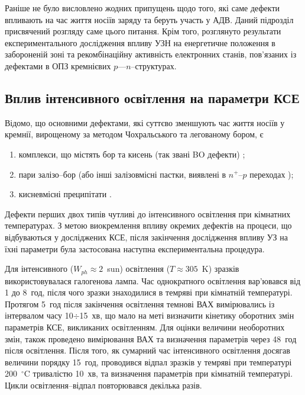 Раніше не було висловлено жодних припущень щодо того, які саме дефекти впливають на час життя
носіїв заряду та беруть участь у АДВ.
Даний підрозділ присвячений розгляду саме цього питання.
Крім того, розглянуто результати експериментального дослідження впливу УЗН на енергетичне положення в забороненій зоні та
рекомбінаційну активність електронних станів, пов'язаних із дефектами в ОПЗ кремнієвих $p$---$n$--структурах.

\subsection{Вплив інтенсивного освітлення на параметри КСЕ\label{sbDefectType}}
Відомо, що основними дефектами, які суттєво зменшують час життя носіїв у кремнії, вирощеному
за методом Чохральського та легованому бором, є
\begin{enumerate}[label=\asbuk*),leftmargin=0em,itemindent=1.5em]
\item  комплекси, що містять бор та кисень (так звані BO дефекти) \cite{LIDRev,LIDRev2};
\item пари залізо--бор \cite{MurphyJAP2011,FeB:Vahanissi,FeB:Schmidt} (або інші залізовмісні пастки, виявлені в $n^+$--$p$ переходах \cite{TeimurazPSS,TeimurazJAP});
\item кисневмісні преципітати \cite{MurphySC2014,Oxide_Schon,MurphyJAP2011,MurphyJAP2012,Oxide:Chen,Oxide:Porrini}.
\end{enumerate}
Дефекти перших двох типів чутливі до інтенсивного освітлення при кімнатних температурах.
З метою виокремлення впливу окремих дефектів на процеси, що відбуваються у досліджених КСЕ,
після закінчення дослідження впливу УЗ на їхні параметри
була застосована наступна експериментальна процедура.

Для інтенсивного ($W_{ph}\approx2$~sun) освітлення ($T\approx305$~K) зразків використовувалася галогенова лампа.
Час однократного освітлення вар'ювався від 1 до 8~год, після чого
зразки знаходилися в темряві при кімнатній температурі.
Протягом 5~год після закінчення освітлення темнові ВАХ вимірювались із інтервалом часу 10$\div$15~хв,
що мало на меті визначити кінетику оборотних змін параметрів КСЕ, викликаних освітленням.
Для оцінки величини необоротних змін, також проведено вимірювання ВАХ та визначення параметрів через 48~год
після освітлення.
Після того, як сумарний час інтенсивного освітлення досягав величини порядку 15~год,
проводився відпал зразків у темряві при температурі 200~$^\circ$C тривалістю 10~хв,
та визначення параметрів при кімнатній температурі.
Цикли освітлення--відпал повторювався декілька разів.

